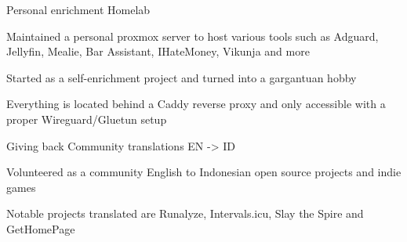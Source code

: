 

\begin{cventries}

  \cventry
    {Personal enrichment} %
    {Homelab} %
    {} %
    {} %
    {
      \begin{cvitems} %
        \item {Maintained a personal proxmox server to host various tools such as Adguard, Jellyfin, Mealie, Bar Assistant, IHateMoney, Vikunja and more}
        \item {Started as a self-enrichment project and turned into a gargantuan hobby}
        \item {Everything is located behind a Caddy reverse proxy and only accessible with a proper Wireguard/Gluetun setup}
      \end{cvitems}
    }

    \cventry
    {Giving back} %
    {Community translations EN -> ID} %
    {} %
    {} %
    {
      \begin{cvitems} %
        \item {Volunteered as a community English to Indonesian open source projects and indie games}
        \item {Notable projects translated are Runalyze, Intervals.icu, Slay the Spire and GetHomePage}
        \end{cvitems}
    }

\end{cventries}
